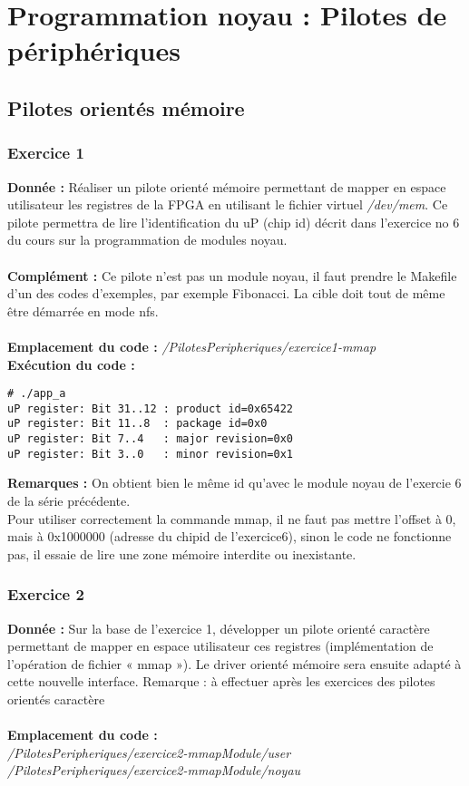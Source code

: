 \newpage
\section{Programmation noyau : Pilotes de périphériques}
\subsection{Pilotes orientés mémoire}
\subsubsection{Exercice 1}
\textbf{Donnée : } Réaliser	un	pilote	orienté	mémoire	permettant	de	mapper	en	espace	utilisateur	les	registres	de	la	
 FPGA	en	utilisant	le	fichier	virtuel	\textit{/dev/mem}.	Ce	pilote	permettra	de	lire	l’identification	du	uP	
(chip	id)	décrit	dans	l’exercice	no 6 du	cours	sur	la	programmation	de	modules	noyau.\\\\
\textbf{Complément : } Ce pilote n'est pas un module noyau, il faut prendre le Makefile d'un des codes d'exemples, par exemple Fibonacci. La cible doit tout de même être démarrée en mode nfs.\\\\
\textbf{Emplacement du code : } \textit{/PilotesPeripheriques/exercice1-mmap}\\

\textbf{Exécution du code : } \\
\begin{lstlisting}
# ./app_a                                                                       
uP register: Bit 31..12 : product id=0x65422                                    
uP register: Bit 11..8  : package id=0x0                                        
uP register: Bit 7..4   : major revision=0x0                                    
uP register: Bit 3..0   : minor revision=0x1 
\end{lstlisting}

\textbf{Remarques : } On obtient bien le même id qu'avec le module noyau de l'exercie 6 de la série précédente.\\
Pour utiliser correctement la commande mmap, il ne faut pas mettre l'offset à 0, mais à 0x1000000 (adresse du chipid de l'exercice6), sinon le code ne fonctionne pas, il essaie de lire une zone mémoire interdite ou inexistante.

\subsubsection{Exercice 2}
\textbf{Donnée : } Sur	la	base	de	l’exercice	1,	développer	un	pilote	orienté	caractère	permettant	de	mapper	en	
espace	utilisateur	ces registres	(implémentation	de	l’opération	de	fichier	« mmap »).	
Le	driver	orienté	mémoire	sera	ensuite	adapté	à	cette	nouvelle	interface.
Remarque :	à	effectuer	après	les	exercices	des	pilotes	orientés	caractère\\\\
\textbf{Emplacement du code : }\\ \textit{/PilotesPeripheriques/exercice2-mmapModule/user}\\
\textit{/PilotesPeripheriques/exercice2-mmapModule/noyau}\\


